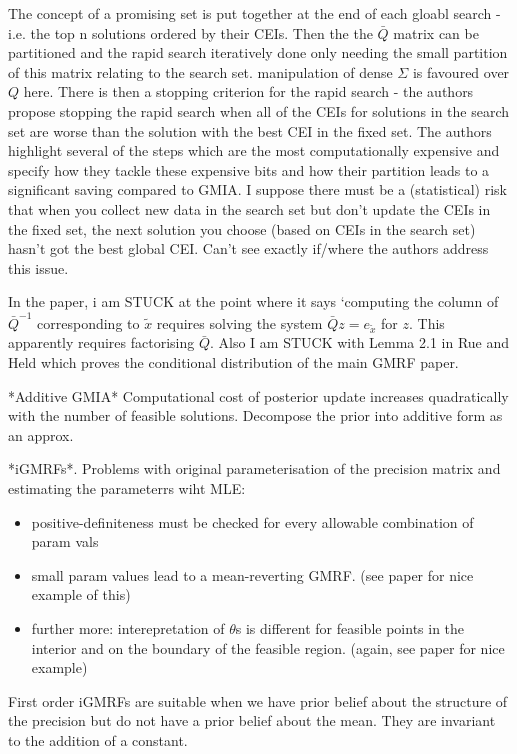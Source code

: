 \documentclass{article}
\begin{document}
The concept of a promising set is put together at the end of each gloabl search - i.e. the top n solutions ordered by their CEIs. Then the the $\bar{Q}$ matrix can be partitioned and the rapid search iteratively done only needing the small partition of this matrix relating to the search set. manipulation of dense $\Sigma$ is favoured over $Q$ here. There is then a stopping criterion for the rapid search - the authors propose stopping the rapid search when all of the CEIs for solutions in the search set are worse than the solution with the best CEI in the fixed set. The authors highlight several of the steps which are the most computationally expensive and specify how they tackle these expensive bits and how their partition leads to a significant saving compared to GMIA. I suppose there must be a (statistical) risk that when you collect new data in the search set but don't update the CEIs in the fixed set, the next solution you choose (based on CEIs in the search set) hasn't got the best global CEI. Can't see exactly if/where the authors address this issue.

In the paper, i am STUCK at the point where it says `computing the column of $\bar{Q}^{-1}$ corresponding to $\tilde{x}$ requires solving the system $\bar{Q}z=e_{\tilde{x}}$ for $z$. This apparently requires factorising $\bar{Q}$.
Also I am STUCK with Lemma 2.1 in Rue and Held which proves the conditional distribution of the main GMRF paper. 

*Additive GMIA* Computational cost of posterior update increases quadratically with the number of feasible solutions. Decompose the prior into additive form as an approx. 

*iGMRFs*. Problems with original parameterisation of the precision matrix and estimating the parameterrs wiht MLE:

\begin{itemize}
\item positive-definiteness must be checked for every allowable combination of param vals
\item small param values lead to a mean-reverting GMRF. (see paper for nice example of this)
  \item further more: interepretation of $\theta$s is different for feasible points in the interior and on the boundary of the feasible region. (again, see paper for nice example)
\end{itemize}

First order iGMRFs are suitable when we have prior belief about the structure of the precision but do not have a prior belief about the mean. They are invariant to the addition of a constant. 
\end{document}
